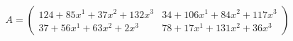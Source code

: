 \documentclass[preview]{standalone}
\begin{document}
\begin{align*}
A = \begin{pmatrix}124 + 85x^{1} + 37x^{2} + 132x^{3} & 34 + 106x^{1} + 84x^{2} + 117x^{3} \\ 37 + 56x^{1} + 63x^{2} + 2x^{3} & 78 + 17x^{1} + 131x^{2} + 36x^{3}\end{pmatrix}
\end{align*}
\end{document}
